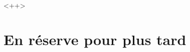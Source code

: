 \begin{MentalActivity}



\end{MentalActivity}<++>

\section{En réserve pour plus tard}

\setcounter{numactivmentale}{1}





